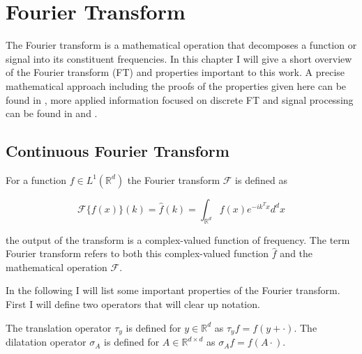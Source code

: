 
\chapter{Fourier Transform} 

The Fourier transform is a mathematical operation that decomposes a function or signal into its constituent frequencies.
In this chapter I will give a short overview of the Fourier transform (FT) and properties important to this work. A precise
mathematical approach including the proofs of the properties given here can be found in \cite{serov2017fourier}, more applied information
focused on discrete FT and signal processing can be found in \cite{smith1997scientist} and \cite{puthusserypady2021applied}.

\section{Continuous Fourier Transform}

\begin{definition}
    For a function $f \in L^1(\mathbb{R}^d)$ the Fourier transform $\mathscr{F}$ is defined as 

    \begin{equation}
        \mathscr{F} \{ f(x) \}(k) = \widehat{f}(k) = \int_{\mathbb{R}^d} f(x) e^{-i k^T x} d^d x
    \end{equation}
    \label{def:fourier_trafo}
\end{definition}

the output of the transform is a complex-valued function of frequency. The term Fourier transform refers to both this complex-valued function $\widehat{f}$ 
and the mathematical operation $\mathscr{F}$.

In the following I will list some important properties of the Fourier transform. First I will define two operators that will clear up notation.

\begin{definition}
    The translation operator $\tau_y$ is defined for $y \in \mathbb{R}^d$ as $\tau_y f = f(y + \cdot)$.
    The dilatation operator $\sigma_A$ is defined for $A \in \mathbb{R}^{d \times d}$ as $\sigma_A f = f(A \cdot)$.
\end{definition}

